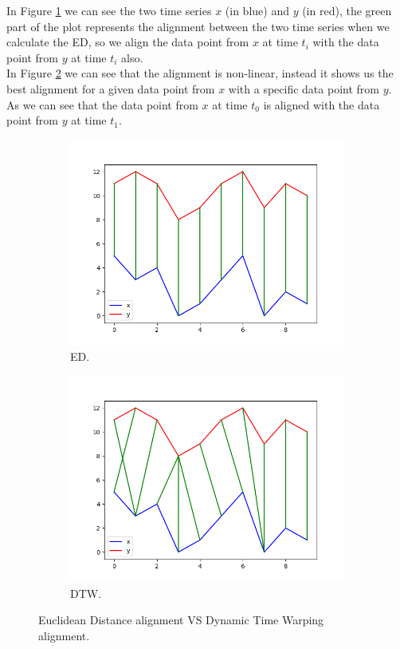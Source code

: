 \documentclass[10pt,a4paper]{article}
\begin{document}
In Figure \ref{fig:ED} we can see the two time series $ x $ (in blue) and $ y $ (in red), the green part of the plot represents the alignment between the two time series when we calculate the ED, so we align the data point from $ x $ at time $ t_i $ with the data point from $ y $ at time $ t_i $ also.\\
In Figure \ref{fig:DTW} we can see that the alignment is non-linear, instead it shows us the best alignment for a given data point from $ x $ with a specific data point from $ y $. As we can see that the data point from $ x $ at time $ t_0 $ is aligned with the data point from $ y $ at time $ t_1 $.

\begin{figure}[H]
\centering
\begin{subfigure}[b]{0.5\textwidth}
\includegraphics[scale=0.5]{ED_TS.png}
\caption{ED.}
\label{fig:ED}
\end{subfigure}
\begin{subfigure}[b]{0.45\textwidth}
\includegraphics[scale=0.5]{DTW_TS.png}
\caption{DTW.}
\label{fig:DTW}
\end{subfigure}
\caption{Euclidean Distance alignment VS Dynamic Time Warping alignment.}
\label{fig:ED_DTW}
\end{figure}
\end{document}
